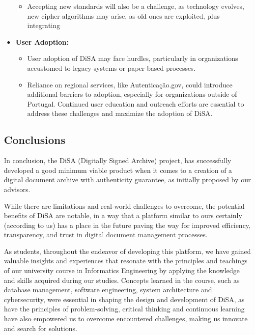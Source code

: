 \documentclass[a4paper,11pt]{article}
\begin{document}
\begin{itemize}
\begin{itemize}
                    \item Accepting new standards will also be a challenge, as technology evolves, new cipher algorithms may arise, as old ones are exploited, plus integrating 
                \end{itemize}
                
                \item \textbf{User Adoption:} 
                \begin{itemize}
                    \item User adoption of DiSA may face hurdles, particularly in organizations accustomed to legacy systems or paper-based processes. 
                    
                    \item Reliance on regional services, like Autenticação.gov, could introduce additional barriers to adoption, especially for organizations outside of Portugal. Continued user education and outreach efforts are essential to address these challenges and maximize the adoption of DiSA.
                \end{itemize}
            \end{itemize}
        
        \subsection{Conclusions}
            \quad In conclusion, the DiSA (Digitally Signed Archive) project, has successfully developed a good minimum viable product when it comes to a creation of a digital document archive with authenticity guarantee, as initially proposed by our advisors.
             
            \quad While there are limitations and real-world challenges to overcome, the potential benefits of DiSA are notable, in a way that a platform similar to ours certainly (according to us) has a place in the future paving the way for improved efficiency, transparency, and trust in digital document management processes.

            \quad As students, throughout the endeavor of developing this platform, we have gained valuable insights and experiences that resonate with the principles and teachings of our university course in Informatics Engineering by applying the knowledge and skills acquired during our studies. Concepts learned in the course, such as database management, software engineering, system architecture and cybersecurity, were essential in shaping the design and development of DiSA, as have the principles of problem-solving, critical thinking and continuous learning have also empowered us to overcome encountered challenges, making us innovate and search for solutions.
\end{document}
